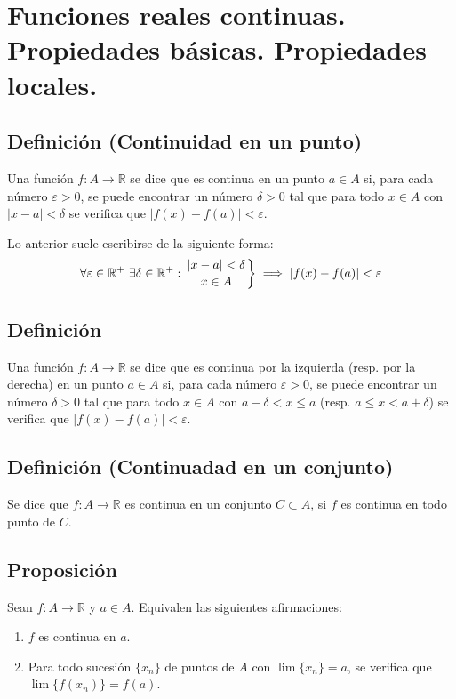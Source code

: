 \documentclass[10pt,a4paper]{article}
\begin{document}
	\newpage
	
	\section{Funciones reales continuas. Propiedades básicas. Propiedades locales.}
	
	\subsection{Definición (Continuidad en un punto)}
	Una función $f : A \rightarrow \mathbb{R}$ se dice que es continua en un punto $a \in A$ si, para cada número $\varepsilon > 0$, se puede encontrar un número $\delta > 0$ tal que para todo $x \in A$ con $|x-a| < \delta$ se verifica que $|f(x) - f(a)| < \varepsilon$.
	
	Lo anterior suele escribirse de la siguiente forma:
	$$\forall \varepsilon \in \mathbb{R} ^+ ~ \exists \delta \in \mathbb{R} ^+ : \left. |x-a| < \delta \atop x \in A \right\} \implies |f(x) - f(a)| < \varepsilon$$
	
	\subsection{Definición}
	Una función $f : A \rightarrow \mathbb{R}$ se dice que es continua por la izquierda (resp. por la derecha) en un punto $a \in A$ si, para cada número $\varepsilon > 0$, se puede encontrar un número $\delta > 0$ tal que para todo $x \in A$ con $a - \delta < x \leq a$ (resp. $a \leq x < a + \delta$) se verifica que $|f(x) - f(a)| < \varepsilon$.
	
	\subsection{Definición (Continuadad en un conjunto)}
	Se dice que $f : A \rightarrow \mathbb{R}$ es continua en un conjunto $C \subset A$, si $f$ es continua en todo punto de $C$.
	
	\subsection{Proposición}
	Sean $f : A \rightarrow \mathbb{R}$ y $a \in A$. Equivalen las siguientes afirmaciones: 
	\begin{enumerate}[label = \alph*)]
		\item $f$ es continua en $a$.
		\item Para todo sucesión $\{x_n\}$ de puntos de $A$ con $\lim\{x_n\} = a$, se verifica que $\lim\{f(x_n)\} = f(a)$.
	\end{enumerate}
	
\end{document}
